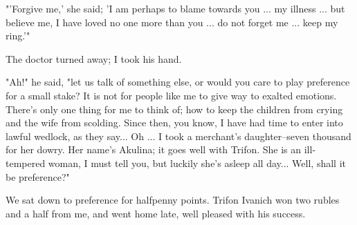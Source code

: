 "'Forgive me,' she said; 'I am perhaps to blame towards you ... my
illness ... but believe me, I have loved no one more than you ... do
not forget me ... keep my ring.'"

The doctor turned away; I took his hand.

"Ah!" he said, "let us talk of something else, or would you care to
play preference for a small stake? It is not for people like me to
give way to exalted emotions. There's only one thing for me to think
of; how to keep the children from crying and the wife from scolding.
Since then, you know, I have had time to enter into lawful wedlock, as
they say... Oh ... I took a merchant's daughter--seven thousand for
her dowry. Her name's Akulina; it goes well with Trifon. She is an
ill-tempered woman, I must tell you, but luckily she's asleep all
day... Well, shall it be preference?"

We sat down to preference for halfpenny points. Trifon Ivanich won two
rubles and a half from me, and went home late, well pleased with his
success.


